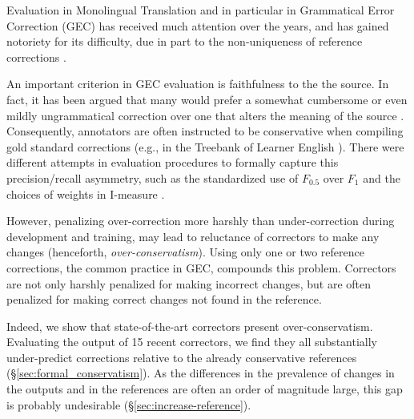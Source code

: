 \documentclass[letterpaper, 11pt]{article}
\begin{document}
Evaluation in Monolingual Translation \cite{xu2015problems,inderjeet2009summarization} and
in particular in Grammatical Error Correction (GEC)
\cite{tetreault2008native,madnani2011they,felice2015towards,bryant2015far,napoles2015ground}
has received much attention over the years, and has gained notoriety for its difficulty,
due in part to the non-uniqueness of reference corrections \cite{chodorow2012problems}.

An important criterion in GEC evaluation is faithfulness to the the source. 
In fact, it has been argued that many would prefer a somewhat cumbersome or even mildly ungrammatical 
correction over one that alters the meaning of the source \cite{brockett2006correcting}.
Consequently, annotators are often instructed to be conservative when compiling gold standard corrections (e.g., in the Treebank of Learner English \cite{nicholls2003cambridge}).
There were different attempts in evaluation procedures to formally capture this precision/recall asymmetry,
such as the standardized use of $F_{0.5}$ over $F_{1}$ \cite{ng2014conll} and the 
choices of weights in I-measure \cite{felice2015towards}.

However, penalizing over-correction more harshly than under-correction during development and training, 
may lead to reluctance of correctors to make any changes (henceforth, {\it over-conservatism}).
Using only one or two reference corrections, the common practice in GEC, compounds this problem. Correctors are not only harshly penalized for making incorrect changes, but are often penalized
for making correct changes not found in the reference.

Indeed, we show that state-of-the-art correctors present over-conservatism.
Evaluating the output of 15 recent correctors, we find they all
substantially under-predict corrections relative to the already conservative references
(\S\ref{sec:formal_conservatism}).
As the differences in the prevalence of changes in the outputs and in the references are
often an order of magnitude large, this gap is probably undesirable (\S\ref{sec:increase-reference}).
\end{document}

